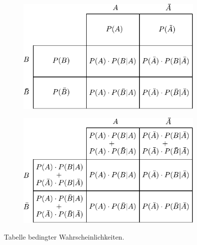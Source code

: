 \begin{figure}[h!]
	\centering
	\begin{subfigure}[b]{0.75\textwidth}
		\centering
		\includegraphics[width=1\textwidth]{bedingte-wahrscheinlichkeit.pdf}
	\end{subfigure}

	\rule[1mm]{0mm}{5mm}

	\begin{subfigure}[b]{0.75\textwidth}
		\centering
		\includegraphics[width=1\textwidth]{bedingte-wahrscheinlichkeit-detail.pdf}
	\end{subfigure}
	\caption{Tabelle bedingter Wahrscheinlichkeiten.}
\end{figure}

